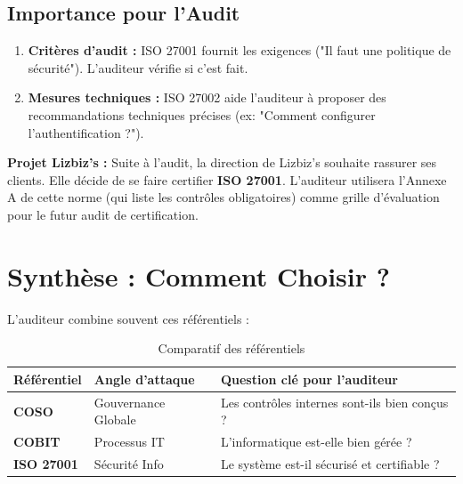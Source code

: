 \subsection{Importance pour l'Audit}

\begin{enumerate}
    \item \textbf{Critères d'audit :} ISO 27001 fournit les exigences ("Il faut une politique de sécurité"). L'auditeur vérifie si c'est fait.
    \item \textbf{Mesures techniques :} ISO 27002 aide l'auditeur à proposer des recommandations techniques précises (ex: "Comment configurer l'authentification ?").
\end{enumerate}

\begin{boxlizbiz}
\textbf{Projet Lizbiz's :}
Suite à l'audit, la direction de Lizbiz's souhaite rassurer ses clients. Elle décide de se faire certifier \textbf{ISO 27001}. L'auditeur utilisera l'Annexe A de cette norme (qui liste les contrôles obligatoires) comme grille d'évaluation pour le futur audit de certification.
\end{boxlizbiz}

\section{Synthèse : Comment Choisir ?}

L'auditeur combine souvent ces référentiels :

\begin{table}[h!]
\centering
\begin{tabular}{p{3cm}p{4cm}p{5cm}}
    \toprule
    \textbf{Référentiel} & \textbf{Angle d'attaque} & \textbf{Question clé pour l'auditeur} \\
    \midrule
    \textbf{COSO} & Gouvernance Globale & Les contrôles internes sont-ils bien conçus ? \\
    \textbf{COBIT} & Processus IT & L'informatique est-elle bien gérée ? \\
    \textbf{ISO 27001} & Sécurité Info & Le système est-il sécurisé et certifiable ? \\
    \bottomrule
\end{tabular}
\caption{Comparatif des référentiels}
\end{table}

